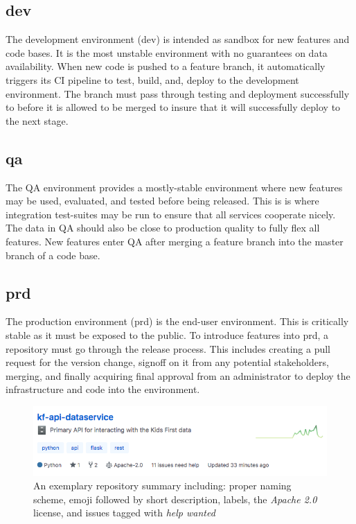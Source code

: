 \documentclass[a4paper,12pt,titlepage]{scrartcl}
\begin{document}
	\subsection{dev}
	
	The development environment (dev) is intended as sandbox for  new features and code bases.
	It is the most unstable environment with no guarantees on data availability.
	When new code is pushed to a feature branch, it automatically triggers its CI pipeline to test, build, and, deploy to the development environment.
	The branch must pass through testing and deployment successfully to before it is allowed to be merged to insure that it will successfully deploy to the next stage.
	
	\subsection{qa}
	
	The QA environment provides a mostly-stable environment where new features may be used, evaluated, and tested before being released.
	This is is where integration test-suites may be run to ensure that all services cooperate nicely.
	The data in QA should also be close to production quality to fully flex all features.
	New features enter QA after merging a feature branch into the master branch of a code base.
	
	\subsection{prd}
	
	The production environment (prd) is the end-user environment.
	This is critically stable as it must be exposed to the public.
	To introduce features into prd, a repository must go through the release process.
	This includes creating a pull request for the version change, signoff on it from any potential stakeholders, merging, and finally acquiring final approval from an administrator to deploy the infrastructure and code into the environment.
	
	\begin{figure}
    		\centering
    		\includegraphics[width=0.6\linewidth]{images/reposummary.png}
    		\caption{An exemplary repository summary including: proper naming scheme, emoji followed by short description, labels, the {\em Apache 2.0} license, and issues tagged with {\em help wanted}}
    		\label{fig:reposummary}
    \end{figure}

	
	 
\end{document}
